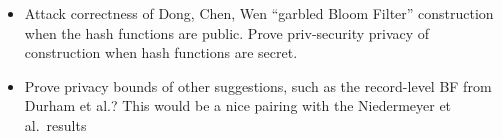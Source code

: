 {\begin{itemize}
\item Attack correctness of Dong, Chen, Wen ``garbled Bloom Filter'' construction when the hash functions are public.  Prove priv-security privacy of construction when hash functions are secret.  

\item Prove privacy bounds of other suggestions, such as the record-level BF from Durham et al.?  This would be a nice pairing with the Niedermeyer et al.\ results 

\end{itemize}
}
